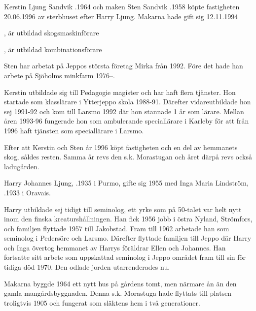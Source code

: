 
Kerstin Ljung Sandvik .1964 och maken Sten Sandvik .1958 köpte fastigheten 20.06.1996 av sterbhuset efter Harry Ljung. Makarna hade gift sig 12.11.1994

\begin{jhchildren}
  \item {}, är utbildad skogsmaskinförare
  \item {}, är utbildad kombinationsförare
\end{jhchildren}

Sten har arbetat på Jeppos största företag Mirka från 1992. Före det hade han arbete på Sjöholms minkfarm 1976--.

Kerstin utbildade sig till Pedagogie magister och har haft flera tjänster. Hon startade som klasslärare i Ytterjeppo skola 1988-91. Därefter vidareutbildade hon sej 1991-92 och kom till Larsmo 1992 där hon stannade 1 år som lärare. Mellan åren 1993-96 fungerade hon som ambulerande speciallärare i Karleby för att från 1996 haft tjänsten som speciallärare i Larsmo.

Efter att Kerstin och Sten år 1996 köpt fastigheten och en del av hemmanets skog, såldes resten. Samma år revs den s.k. Morastugan och året därpå revs också ladugården.


Harry Johannes Ljung, .1935 i Purmo, gifte sig 1955 med Inga Maria Lindström, .1933 i Oravais.

Harry utbildade sej tidigt till seminolog, ett yrke som på 50-talet var helt nytt inom den finska kreaturshållningen. Han fick 1956 jobb i östra Nyland, Strömfors, och familjen flyttade 1957 till Jakobstad. Fram till 1962 arbetade han som seminolog i Pedersöre och Larsmo. Därefter flyttade familjen till Jeppo där Harry och Inga övertog hemmanet av Harrys föräldrar Ellen och Johannes. Han fortsatte sitt arbete som uppskattad seminolog i Jeppo området fram till sin för tidiga död 1970. Den odlade jorden utarrenderades nu.

Makarna byggde 1964 ett nytt hus på gårdens tomt, men närmare ån än den gamla mangårdsbyggnaden. Denna s.k. Morastuga hade flyttats till platsen troligtvis 1905 och fungerat som släktens hem i två generationer.

